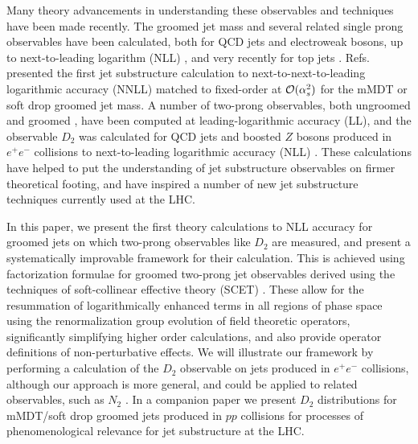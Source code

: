 \documentclass[a4paper,11pt]{article}
\DeclareRobustCommand{\Refs}[1]{Refs.~\cite{#1}}
\begin{document}
Many theory advancements in understanding these observables and techniques have been made recently.  The groomed jet mass and several related single prong observables have been calculated, both for QCD jets and electroweak bosons, up to next-to-leading logarithm (NLL) \cite{Dasgupta:2013ihk,Dasgupta:2013via,Larkoski:2014wba,Dasgupta:2015yua}, and very recently for top jets \cite{Hoang:2017kmk}.  \Refs{Frye:2016okc,Frye:2016aiz} presented the first jet substructure calculation to next-to-next-to-leading logarithmic accuracy (NNLL) matched to fixed-order at ${\cal O}(\alpha_s^2)$ for the mMDT or soft drop groomed jet mass.   A number of two-prong observables, both ungroomed \cite{Dasgupta:2015lxh} and groomed \cite{Dasgupta:2016ktv,Salam:2016yht}, have been computed at leading-logarithmic accuracy (LL), and the observable $D_2$ was calculated for QCD jets and boosted $Z$ bosons produced in $e^+e^-$ collisions to next-to-leading logarithmic accuracy (NLL) \cite{Larkoski:2015kga}. These calculations have helped to put the understanding of jet substructure observables on firmer theoretical footing, and have inspired a number of new jet substructure techniques currently used at the LHC.

In this paper, we present the first theory calculations to NLL accuracy for groomed jets on which two-prong observables like $D_2$ are measured, and present a systematically improvable framework for their calculation. This is achieved using factorization formulae for groomed two-prong jet observables derived using the techniques of soft-collinear effective theory (SCET) \cite{Bauer:2000yr,Bauer:2001ct,Bauer:2001yt,Bauer:2002nz,Rothstein:2016bsq}. These allow for the resummation of logarithmically enhanced terms in all regions of phase space using the renormalization group evolution of field theoretic operators, significantly simplifying higher order calculations, and also provide operator definitions of non-perturbative effects.  We will illustrate our framework by performing a calculation of the $D_2$ observable on jets produced in $e^+e^-$ collisions, although our approach is more general, and could be applied to related observables, such as $N_2$ \cite{Moult:2016cvt}. In a companion paper \cite{Larkoski:2017iuy} we present $D_2$ distributions for mMDT/soft drop groomed jets produced in $pp$ collisions for processes of phenomenological relevance for jet substructure at the LHC. 
\end{document}
